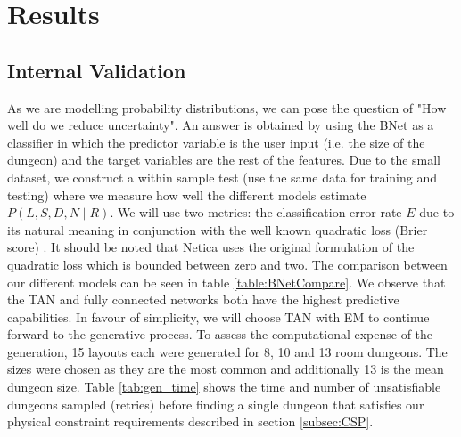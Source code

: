 \documentclass{UoYCSproject}
\begin{document}
\chapter{Results}
\label{cha:results}
\section{Internal Validation}
As we are modelling probability distributions, we can pose the question of "How well do we reduce uncertainty". An answer is obtained by using the BNet as a classifier in which the predictor variable is the user input (i.e. the size of the dungeon) and the target variables are the rest of the features. Due to the small dataset, we construct a within sample test (use the same data for training and testing) where we measure how well the different models estimate \(P(L,S,D,N\mid R)\). We will use two metrics: the classification error rate \(E\) due to its natural meaning in conjunction with the well known quadratic loss (Brier score) \parencite{PearlScoringRules}. It should be noted that Netica uses the original formulation of the quadratic loss which is bounded between zero and two. The comparison between our different models can be seen in table \ref{table:BNetCompare}. We observe that the TAN and fully connected networks both have the highest predictive capabilities. In favour of simplicity, we will choose TAN with EM to continue forward to the generative process. To assess the computational expense of the generation, 15 layouts each were generated for 8, 10 and 13 room dungeons. The sizes were chosen as they are the most common and additionally 13 is the mean dungeon size. Table \ref{tab:gen_time} shows the time and number of unsatisfiable dungeons sampled (retries) before finding a single dungeon that satisfies our physical constraint requirements described in section \ref{subsec:CSP}.
\end{document}
